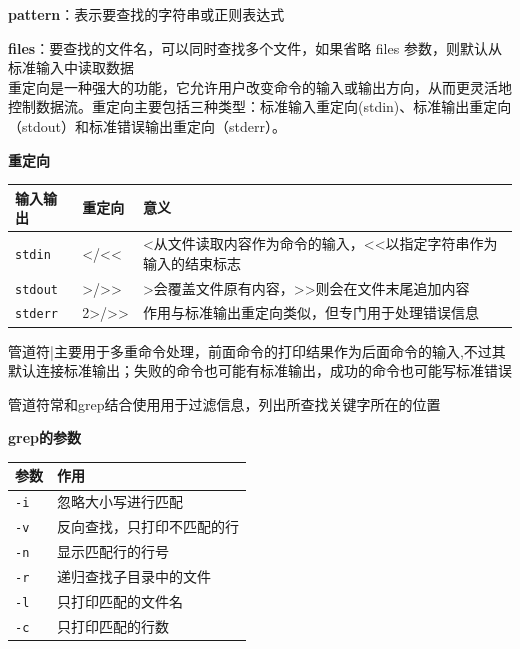 \textbf{pattern}：表示要查找的字符串或正则表达式

\textbf{files}：要查找的文件名，可以同时查找多个文件，如果省略 files 参数，则默认从标准输入中读取数据\\

重定向是一种强大的功能，它允许用户改变命令的输入或输出方向，从而更灵活地控制数据流。重定向主要包括三种类型：标准输入重定向(stdin)、标准输出重定向（stdout）和标准错误输出重定向（stderr）。


\begin{table}[H]\centering
\textbf{重定向}

	\begin{tabular}{p{}p{}p{}}
		\toprule[1.5pt]
		输入输出 & 重定向 & 意义\\
		\midrule[1pt]
		\texttt{stdin}		& <\enspace /\enspace <<		& <从文件读取内容作为命令的输入，<<以指定字符串作为输入的结束标志\\
		\texttt{stdout}		& >\enspace /\enspace >>		& >会覆盖文件原有内容，>>则会在文件末尾追加内容\\
		\texttt{stderr}		& 2>\enspace /\enspace 2>>		&作用与标准输出重定向类似，但专门用于处理错误信息\\
		\bottomrule[1.5pt]
	\end{tabular}
\end{table}


管道符|主要用于多重命令处理，前面命令的打印结果作为后面命令的输入,不过其默认连接标准输出；失败的命令也可能有标准输出，成功的命令也可能写标准错误

管道符常和grep结合使用用于过滤信息，列出所查找关键字所在的位置


\begin{table}[H]\centering
\textbf{grep的参数}

	\begin{tabular}{p{}p{}}
		\toprule[1.5pt]
		参数 & 作用\\
		\midrule[1pt]
		\texttt{-i}		&忽略大小写进行匹配\\
		\texttt{-v}		&反向查找，只打印不匹配的行\\
		\texttt{-n}		&显示匹配行的行号\\
		\texttt{-r}		&递归查找子目录中的文件\\
		\texttt{-l}		&只打印匹配的文件名\\
		\texttt{-c}		&只打印匹配的行数\\
		\bottomrule[1.5pt]
	\end{tabular}
\end{table}



